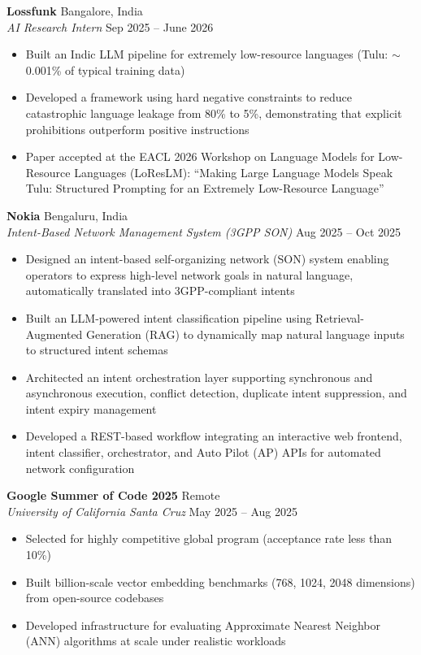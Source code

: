 \documentclass[a4paper,9pt]{extarticle}
\begin{document}
\noindent
\textbf{Lossfunk} \hfill Bangalore, India\\
\textit{AI Research Intern} \hfill Sep 2025 -- June 2026
\begin{itemize}
    \item Built an Indic LLM pipeline for extremely low-resource languages (Tulu: $\sim$0.001\% of typical training data)
    \item Developed a framework using hard negative constraints to reduce catastrophic language leakage from 80\% to 5\%, demonstrating that explicit prohibitions outperform positive instructions
    \item Paper accepted at the EACL 2026 Workshop on Language Models for Low-Resource Languages (LoResLM): ``Making Large Language Models Speak Tulu: Structured Prompting for an Extremely Low-Resource Language''
\end{itemize}

\noindent
\textbf{Nokia} \hfill Bengaluru, India\\
\textit{Intent-Based Network Management System (3GPP SON)} \hfill Aug 2025 -- Oct 2025
\begin{itemize}
    \item Designed an intent-based self-organizing network (SON) system enabling operators to express high-level network goals in natural language, automatically translated into 3GPP-compliant intents
    \item Built an LLM-powered intent classification pipeline using Retrieval-Augmented Generation (RAG) to dynamically map natural language inputs to structured intent schemas
    \item Architected an intent orchestration layer supporting synchronous and asynchronous execution, conflict detection, duplicate intent suppression, and intent expiry management
    \item Developed a REST-based workflow integrating an interactive web frontend, intent classifier, orchestrator, and Auto Pilot (AP) APIs for automated network configuration
\end{itemize}

\noindent
\textbf{Google Summer of Code 2025} \hfill Remote\\
\textit{University of California Santa Cruz} \hfill May 2025 -- Aug 2025
\begin{itemize}
    \item Selected for highly competitive global program (acceptance rate less than 10\%)
    \item Built billion-scale vector embedding benchmarks (768, 1024, 2048 dimensions) from open-source codebases
    \item Developed infrastructure for evaluating Approximate Nearest Neighbor (ANN) algorithms at scale under realistic workloads
\end{itemize}
\end{document}
